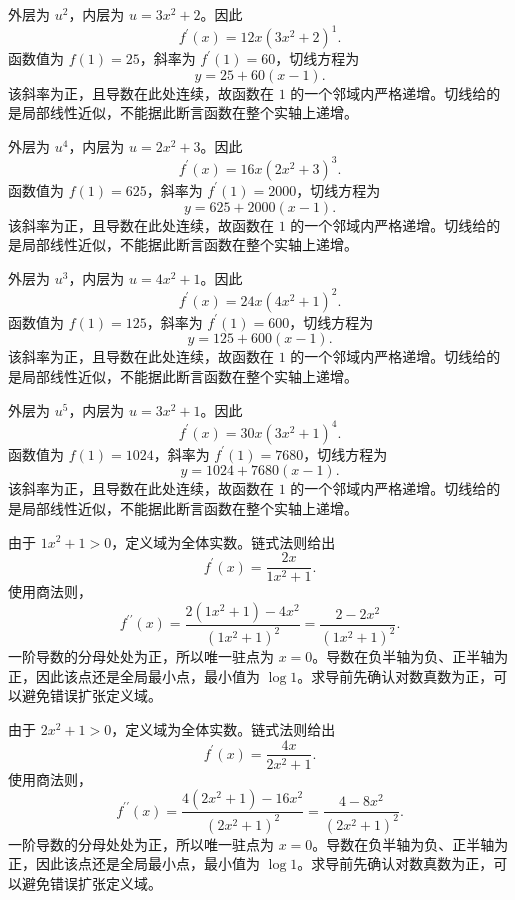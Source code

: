 \documentclass[12pt,fontset=fandol]{ctexart}
\begin{document}
\begin{solve}\label{ans:c8q9}
外层为 $u^{2}$，内层为 $u=3x^2+2$。因此
\[
f^{\prime}(x)=12x(3x^2+2)^{1}.
\]
函数值为 $f(1)=25$，斜率为 $f^{\prime}(1)=60$，切线方程为
\[
y=25+60(x-1).
\]
该斜率为正，且导数在此处连续，故函数在 $1$ 的一个邻域内严格递增。切线给的是局部线性近似，不能据此断言函数在整个实轴上递增。
\end{solve}

\begin{solve}\label{ans:c8q10}
外层为 $u^{4}$，内层为 $u=2x^2+3$。因此
\[
f^{\prime}(x)=16x(2x^2+3)^{3}.
\]
函数值为 $f(1)=625$，斜率为 $f^{\prime}(1)=2000$，切线方程为
\[
y=625+2000(x-1).
\]
该斜率为正，且导数在此处连续，故函数在 $1$ 的一个邻域内严格递增。切线给的是局部线性近似，不能据此断言函数在整个实轴上递增。
\end{solve}

\begin{solve}\label{ans:c8q11}
外层为 $u^{3}$，内层为 $u=4x^2+1$。因此
\[
f^{\prime}(x)=24x(4x^2+1)^{2}.
\]
函数值为 $f(1)=125$，斜率为 $f^{\prime}(1)=600$，切线方程为
\[
y=125+600(x-1).
\]
该斜率为正，且导数在此处连续，故函数在 $1$ 的一个邻域内严格递增。切线给的是局部线性近似，不能据此断言函数在整个实轴上递增。
\end{solve}

\begin{solve}\label{ans:c8q12}
外层为 $u^{5}$，内层为 $u=3x^2+1$。因此
\[
f^{\prime}(x)=30x(3x^2+1)^{4}.
\]
函数值为 $f(1)=1024$，斜率为 $f^{\prime}(1)=7680$，切线方程为
\[
y=1024+7680(x-1).
\]
该斜率为正，且导数在此处连续，故函数在 $1$ 的一个邻域内严格递增。切线给的是局部线性近似，不能据此断言函数在整个实轴上递增。
\end{solve}

\begin{solve}\label{ans:c8q13}
由于 $1x^2+1>0$，定义域为全体实数。链式法则给出
\[
f^{\prime}(x)=\frac{2x}{1x^2+1}.
\]
使用商法则，
\[
f^{\prime\prime}(x)=\frac{2(1x^2+1)-4x^2}{(1x^2+1)^2}=\frac{2-2x^2}{(1x^2+1)^2}.
\]
一阶导数的分母处处为正，所以唯一驻点为 $x=0$。导数在负半轴为负、正半轴为正，因此该点还是全局最小点，最小值为 $\log 1$。求导前先确认对数真数为正，可以避免错误扩张定义域。
\end{solve}

\begin{solve}\label{ans:c8q14}
由于 $2x^2+1>0$，定义域为全体实数。链式法则给出
\[
f^{\prime}(x)=\frac{4x}{2x^2+1}.
\]
使用商法则，
\[
f^{\prime\prime}(x)=\frac{4(2x^2+1)-16x^2}{(2x^2+1)^2}=\frac{4-8x^2}{(2x^2+1)^2}.
\]
一阶导数的分母处处为正，所以唯一驻点为 $x=0$。导数在负半轴为负、正半轴为正，因此该点还是全局最小点，最小值为 $\log 1$。求导前先确认对数真数为正，可以避免错误扩张定义域。
\end{solve}
\end{document}
